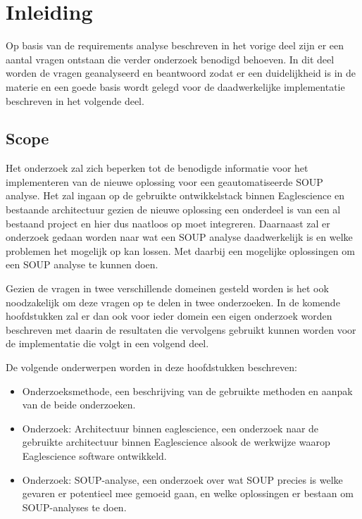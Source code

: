 
\chapter{Inleiding} %

\label{inOnderzoek} %
Op basis van de requirements analyse beschreven in het vorige deel zijn er een aantal vragen ontstaan die verder onderzoek benodigd behoeven. In dit deel worden de vragen geanalyseerd en beantwoord zodat er een duidelijkheid is in de materie en een goede basis wordt gelegd voor de daadwerkelijke implementatie beschreven in het volgende deel.

\section{Scope}
Het onderzoek zal zich beperken tot de benodigde informatie voor het implementeren van de nieuwe oplossing voor een geautomatiseerde SOUP analyse. Het zal ingaan op de gebruikte ontwikkelstack binnen Eaglescience en bestaande architectuur gezien de nieuwe oplossing een onderdeel is van een al bestaand project en hier dus naatloos op moet integreren. Daarnaast zal er onderzoek gedaan worden naar wat een SOUP analyse daadwerkelijk is en welke problemen het mogelijk op kan lossen. Met daarbij een mogelijke oplossingen om een SOUP analyse te kunnen doen.

Gezien de vragen in twee verschillende domeinen gesteld worden is het ook noodzakelijk om deze vragen op te delen in twee onderzoeken. In de komende hoofdstukken zal er dan ook voor ieder domein een eigen onderzoek worden beschreven met daarin de resultaten die vervolgens gebruikt kunnen worden voor de implementatie die volgt in een volgend deel.

De volgende onderwerpen worden in deze hoofdstukken beschreven:
\begin{itemize}
\item Onderzoeksmethode, een beschrijving van de gebruikte methoden en aanpak van de beide onderzoeken.
\item Onderzoek: Architectuur binnen eaglescience, een onderzoek naar de gebruikte architectuur binnen Eaglescience alsook de werkwijze waarop Eaglescience software ontwikkeld.
\item Onderzoek: SOUP-analyse, een onderzoek over wat SOUP precies is welke gevaren er potentieel mee gemoeid gaan, en welke oplossingen er bestaan om SOUP-analyses te doen.
\end{itemize}
